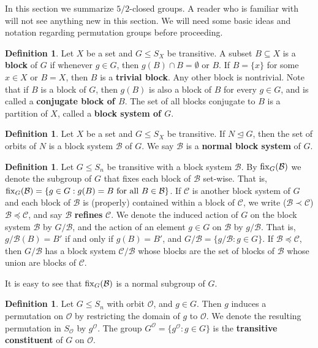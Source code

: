 \documentclass{amsart}
\theoremstyle{definition}
\newtheorem{definition}[thrm]{Definition}
\theoremstyle{remark}
\numberwithin{equation}{section}
\def\tl{{\unlhd}}
\def\fix{{\rm fix}}
\def\cal{\mathcal}
\begin{document}
In this section we summarize $5/2$-closed groups.  A reader who is familiar with \cite{Dobson2023apreprint} will not see anything new in this section.  We will need some basic ideas and notation regarding permutation groups before proceeding.

\begin{definition}\label{imprimitive}
Let $X$ be a set and $G\le S_X$ be transitive.  A subset $B\subseteq X$ is a {\bf block} of $G$ if whenever $g\in G$, then $g(B)\cap B = \emptyset$ or $B$.  If $B = \{x\}$ for some $x\in X$ or $B = X$, then $B$ is a {\bf trivial block}.  Any other block is nontrivial.  Note that if $B$ is a block of $G$, then $g(B)$ is also a block of $B$ for every $g\in G$, and is called a {\bf conjugate block of $B$}.  The set of all blocks conjugate to $B$ is a partition of $X$, called a {\bf block system of $G$}.
\end{definition}

\begin{definition}
Let $X$ be a set and $G\le S_X$ be transitive.  If $N\tl G$, then the set of orbits of $N$ is a block system ${\cal B}$ of $G$.  We say ${\cal B}$ is a {\bf normal block system} of $G$.
\end{definition}

\begin{definition}
Let $G\le S_n$ be transitive with a block system ${\cal B}$.  By $\fix_G({\cal B})$ we denote the subgroup of $G$ that fixes each
block of ${\cal B}$ set-wise.  That is, $\fix_G({\cal B}) = \{g\in G:g(B) = B{\rm\ for\ all\ }B\in{\cal B}\}$.  If ${\cal C}$ is another block system of $G$ and each block of ${\cal B}$ is (properly) contained within a block of ${\cal C}$, we write (${\cal B}\prec{\cal C}$) ${\cal B}\preceq{\cal C}$, and say ${\cal B}$ {\bf refines} ${\cal C}$.  We denote the induced action of $G$ on the block system ${\cal B}$ by $G/{\cal B}$, and the action of an element $g\in G$ on ${\cal B}$ by $g/{\cal B}$.  That is, $g/{\cal B}(B) = B'$ if and only if $g(B) = B'$, and $G/{\cal B} = \{g/{\cal B}:g\in G\}$.  If ${\cal B}\preceq{\cal C}$, then $G/{\cal B}$ has a block system ${\cal C}/{\cal B}$ whose blocks are the set of blocks of ${\cal B}$ whose union are blocks of ${\cal C}$.
\end{definition}

It is easy to see that $\fix_G({\cal B})$ is a normal subgroup of $G$.

\begin{definition}
Let $G\le S_n$ with orbit ${\cal O}$, and $g\in G$. Then $g$ induces a permutation on ${\cal O}$ by restricting the domain of $g$ to ${\cal O}$.  We denote the resulting permutation in $S_{\cal O}$ by $g^{\cal O}$.  The group $G^{\cal O} = \{g^{\cal O}:g\in G\}$ is the  {\bf transitive constituent} of $G$ on ${\cal O}$.
\end{definition}
\end{document}
